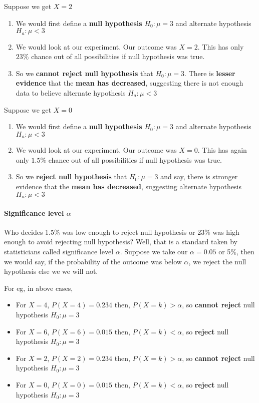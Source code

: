 \documentclass[float=false,crop=false]{standalone}
\begin{document}
Suppose we get \(X=2\)

\begin{enumerate}
\def\labelenumi{\arabic{enumi}.}
\tightlist
\item
  We would first define a \textbf{null hypothesis} \(H_0: \mu = 3\) and
  alternate hypothesis \(H_a: \mu < 3\)
\item
  We would look at our experiment. Our outcome was \(X = 2\). This has
  only \(23\%\) chance out of all possibilities if null hypothesis was
  true.
\item
  So we \textbf{cannot reject null hypothesis} that \(H_0: \mu = 3\).
  There is \textbf{lesser evidence} that the \textbf{mean has
  decreased}, suggesting there is not enough data to believe alternate
  hypothesis \(H_a: \mu < 3\)
\end{enumerate}

Suppose we get \(X=0\)

\begin{enumerate}
\def\labelenumi{\arabic{enumi}.}
\tightlist
\item
  We would first define a \textbf{null hypothesis} \(H_0: \mu = 3\) and
  alternate hypothesis \(H_a: \mu < 3\)
\item
  We would look at our experiment. Our outcome was \(X = 0\). This has
  again only \(1.5\%\) chance out of all possibilities if null
  hypothesis was true.
\item
  So we \textbf{reject null hypothesis} that \(H_0: \mu = 3\) and say,
  there is stronger evidence that the \textbf{mean has decreased},
  suggesting alternate hypothesis \(H_a: \mu < 3\)
\end{enumerate}

    \paragraph{\texorpdfstring{Significance level
\(\alpha\)}{Significance level \textbackslash{}alpha}}\label{significance-level-alpha}

Who decides 1.5\% was low enough to reject null hypothesis or 23\% was
high enough to avoid rejecting null hypothesis? Well, that is a standard
taken by statisticians called significance level \(\alpha\). Suppose we
take our \(\alpha = 0.05\) or 5\%, then we would say, if the probability
of the outcome was below \(\alpha\), we reject the null hypothesis else
we we will not.

For eg, in above cases,

\begin{itemize}
\tightlist
\item
  For \(X=4\), \(P(X=4) = 0.234\) then, \(P(X=k) > \alpha\), so
  \textbf{cannot reject} null hypothesis \(H_0: \mu = 3\)
\item
  For \(X=6\), \(P(X=6) = 0.015\) then, \(P(X=k) < \alpha\), so
  \textbf{reject} null hypothesis \(H_0: \mu = 3\)
\item
  For \(X=2\), \(P(X=2) = 0.234\) then, \(P(X=k) > \alpha\), so
  \textbf{cannot reject} null hypothesis \(H_0: \mu = 3\)
\item
  For \(X=0\), \(P(X=0) = 0.015\) then, \(P(X=k) < \alpha\), so
  \textbf{reject} null hypothesis \(H_0: \mu = 3\)
\end{itemize}
\end{document}
